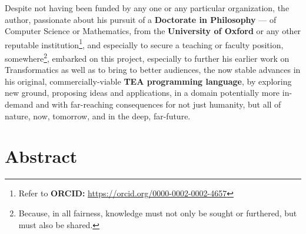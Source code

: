 \documentclass[a4paper, 18pt]{book} %
\begin{document}
Despite not having been funded by any one or any particular organization, the author, passionate about his pursuit of a \textbf{Doctorate in Philosophy} --- of Computer Science or Mathematics, from the \textbf{University of Oxford}\cite{lutalo_2025_sop}\cite{Lutalo2025_phd} or any other reputable institution\footnote{Refer to \textbf{ORCID:} \url{https://orcid.org/0000-0002-0002-4657}}, and especially to secure a teaching or faculty position, somewhere\footnote{Because, in all fairness, knowledge must not only be sought or furthered, but must also be shared.}, embarked on this project, especially to further his earlier work on Transformatics\cite{transformatics} as well as to bring to better audiences, the now stable advances in his original, commercially-viable \textbf{TEA programming language}\cite{cli_tttt}, by exploring new ground, proposing ideas and applications, in a domain potentially more in-demand and with far-reaching consequences for not just humanity, but all of nature, now, tomorrow, and in the deep, far-future. 



\mainmatter

\chapter*{Abstract}
\large
\end{document}
